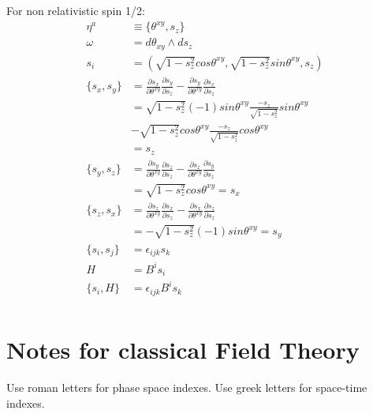 \documentclass[aps,pra,10pt,twocolumn,floatfix,nofootinbib]{revtex4-1}
\theoremstyle{definition}
\begin{document}
For non relativistic spin 1/2:
\begin{align*}
\eta^a &\equiv \{\theta^{xy}, s_z\} \\
\omega &= d\theta_{xy} \wedge ds_z \\
s_i &= ( \sqrt{1-s_z^2} cos \theta^{xy}, \sqrt{1-s_z^2} sin \theta^{xy}, s_z) \\
\{ s_x, s_y \} &= \frac{\partial s_x}{\partial \theta^{xy}} \frac{\partial s_y}{\partial s_z} - \frac{\partial s_y}{\partial \theta^{xy}} \frac{\partial s_x}{\partial s_z} \\
&= \sqrt{1-s_z^2} (-1) sin \theta^{xy} \frac{-s_z}{\sqrt{1-s_z^2}}sin \theta^{xy}  \\
&- \sqrt{1-s_z^2} cos \theta^{xy} \frac{-s_z}{\sqrt{1-s_z^2}}cos \theta^{xy} \\
&= s_z \\
\{ s_y, s_z \} &= \frac{\partial s_y}{\partial \theta^{xy}} \frac{\partial s_z}{\partial s_z} - \frac{\partial s_z}{\partial \theta^{xy}} \frac{\partial s_y}{\partial s_z}\\
&= \sqrt{1-s_z^2} cos \theta^{xy} = s_x\\
\{ s_z, s_x \} &= \frac{\partial s_z}{\partial \theta^{xy}} \frac{\partial s_x}{\partial s_z} - \frac{\partial s_x}{\partial \theta^{xy}} \frac{\partial s_z}{\partial s_z}\\
&= - \sqrt{1-s_z^2} (-1) sin \theta^{xy} = s_y \\
\{ s_i, s_j \} &= \epsilon_{ijk} s_k \\
H &= B^i s_i \\
\{ s_i, H \} &= \epsilon_{ijk}B^i s_k \\
\end{align*}


\section{Notes for classical Field Theory}

Use roman letters for phase space indexes. Use greek letters for space-time indexes.
\end{document}
